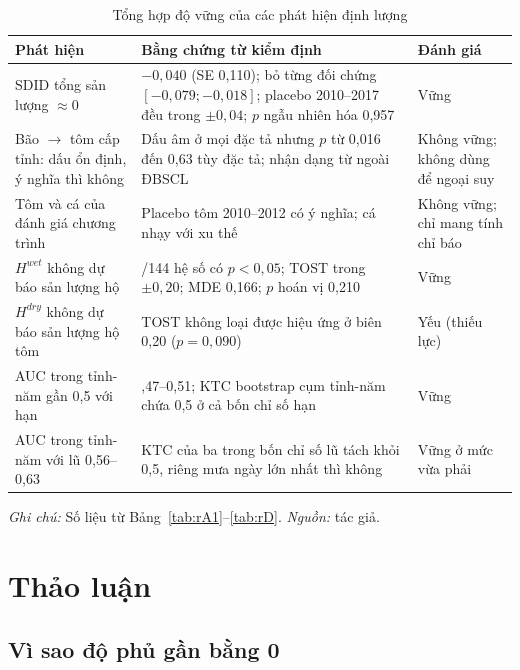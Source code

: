 \documentclass[12pt,a4paper]{article}
\begin{document}
\begin{table}[!tbp]
\centering\footnotesize
\caption{Tổng hợp độ vững của các phát hiện định lượng}
\label{tab:robustsum}
\begin{tabularx}{\textwidth}{@{}>{\raggedright\arraybackslash}p{3.7cm}>{\raggedright\arraybackslash}X>{\raggedright\arraybackslash}p{2.1cm}@{}}
\toprule
Phát hiện & Bằng chứng từ kiểm định & Đánh giá \\
\midrule
SDID tổng sản lượng $\approx 0$ & $-0{,}040$ (SE 0,110); bỏ từng đối chứng $[-0{,}079;-0{,}018]$; placebo 2010--2017 đều trong $\pm0{,}04$; $p$ ngẫu nhiên hóa 0,957 & Vững \\
Bão $\to$ tôm cấp tỉnh: dấu ổn định, ý nghĩa thì không & Dấu âm ở mọi đặc tả nhưng $p$ từ 0,016 đến 0,63 tùy đặc tả; nhận dạng từ ngoài ĐBSCL & Không vững; không dùng để ngoại suy \\
Tôm và cá của đánh giá chương trình & Placebo tôm 2010--2012 có ý nghĩa; cá nhạy với xu thế & Không vững; chỉ mang tính chỉ báo \\
$H^{wet}$ không dự báo sản lượng hộ & 4/144 hệ số có $p<0{,}05$; TOST trong $\pm0{,}20$; MDE 0,166; $p$ hoán vị 0,210 & Vững \\
$H^{dry}$ không dự báo sản lượng hộ tôm & TOST không loại được hiệu ứng ở biên 0,20 ($p=0{,}090$) & Yếu (thiếu lực) \\
AUC trong tỉnh-năm gần 0,5 với hạn & 0,47--0,51; KTC bootstrap cụm tỉnh-năm chứa 0,5 ở cả bốn chỉ số hạn & Vững \\
AUC trong tỉnh-năm với lũ 0,56--0,63 & KTC của ba trong bốn chỉ số lũ tách khỏi 0,5, riêng mưa ngày lớn nhất thì không & Vững ở mức vừa phải \\
\bottomrule
\end{tabularx}
\begin{minipage}{\textwidth}\footnotesize
\textit{Ghi chú:} Số liệu từ Bảng~\ref{tab:rA1}--\ref{tab:rD}. \textit{Nguồn:} tác giả.
\end{minipage}
\end{table}

\section{Thảo luận}
\label{sec:discussion}

\subsection{Vì sao độ phủ gần bằng 0}
\end{document}
